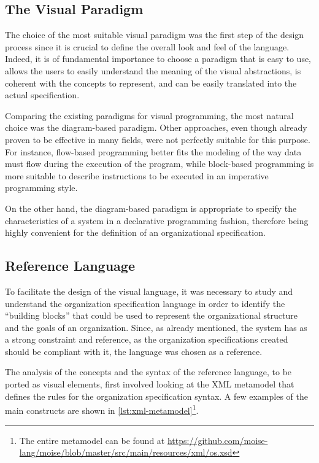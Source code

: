 \subsection{The Visual Paradigm}
The choice of the most suitable visual paradigm was the first step of the design process since it is crucial to define the overall look and feel of the language.
Indeed, it is of fundamental importance to choose a paradigm that is easy to use, allows the users to easily understand the meaning of the visual abstractions, is coherent with the concepts to represent, and can be easily translated into the actual specification.

Comparing the existing paradigms for visual programming, the most natural choice was the diagram-based paradigm.
Other approaches, even though already proven to be effective in many fields, were not perfectly suitable for this purpose.
For instance, flow-based programming better fits the modeling of the way data must flow during the execution of the program, while block-based programming is more suitable to describe instructions to be executed in an imperative programming style.

On the other hand, the diagram-based paradigm is appropriate to specify the characteristics of a system in a declarative programming fashion, therefore being highly convenient for the definition of an organizational specification.

\subsection{Reference Language}
To facilitate the design of the visual language, it was necessary to study and understand the organization specification language in order to identify the ``building blocks'' that could be used to represent the organizational structure and the goals of an organization.
Since, as already mentioned, the system has \moise{} as a strong constraint and reference, as the organization specifications created should be compliant with it, the \moise{} language was chosen as a reference.

The analysis of the concepts and the syntax of the reference language, to be ported as visual elements, first involved looking at the \moise{} XML metamodel that defines the rules for the organization specification syntax.
A few examples of the main constructs are shown in \cref{lst:xml-metamodel}\footnote{The entire metamodel can be found at \url{https://github.com/moise-lang/moise/blob/master/src/main/resources/xml/os.xsd}}.

